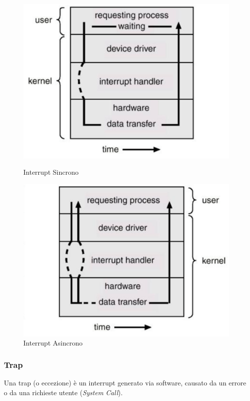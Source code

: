 \begin{figure}[H]
    \centering
    \begin{minipage}{0.4\textwidth}
        \centering
        \includegraphics[width=0.8\linewidth]{assets/interrupt-sync.png}
        \caption{Interrupt Sincrono}
    \end{minipage}
    \hspace{0.01\textwidth}
    \begin{minipage}{0.4\textwidth}
        \centering
        \includegraphics[width=0.8\linewidth]{assets/interrupt-async.png}
        \caption{Interrupt Asincrono}
    \end{minipage}
\end{figure}

\subsubsection{Trap}
Una trap (o eccezione) è un interrupt generato via software, causato da un errore o da una richieste utente (\textit{System Call}).

